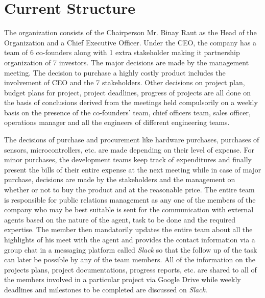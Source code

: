 \documentclass[12pt,a4paper]{scrreprt}
\begin{document}
\section{Current Structure}
    The organization consists of the Chairperson Mr. Binay Raut as the Head of the Organization and a Chief Executive Officer. Under the CEO, the company has a team of 6 co-founders along with 1 extra stakeholder making it partnership organization of 7 investors. The major decisions are made by the management meeting. The decision to purchase a highly costly product includes the involvement of CEO and the 7 stakeholders. Other decisions on project plan, budget plans for project, project deadlines, progress of projects are all done on the basis of conclusions derived from the meetings held compulsorily on a weekly basis on the presence of the co-founders' team, chief officers team, sales officer, operations manager and all the engineers of different engineering teams.

    The decisions of purchase and procurement like hardware purchases, purchases of sensors, microcontrollers, etc. are made depending on their level of expense. For minor purchases, the development teams keep track of expenditures and finally present the bills of their entire expense at the next meeting while in case of major purchase, decisions are made by the stakeholders and the management on whether or not to buy the product and at the reasonable price. The entire team is responsible for public relations management as any one of the members of the company who may be best suitable is sent for the communication with external agents based on the nature of the agent, task to be done and the required expertise. The member then mandatorily updates the entire team about all the highlights of his meet with the agent and provides the contact information via a group chat in a messaging platform called \textit{Slack} so that the follow up of the task can later be possible by any of the team members. All of the information on the projects plans, project documentations, progress reports, etc. are shared to all of the members involved in a particular project via Google Drive while weekly deadlines and milestones to be completed are discussed on \textit{Slack}.
\end{document}
